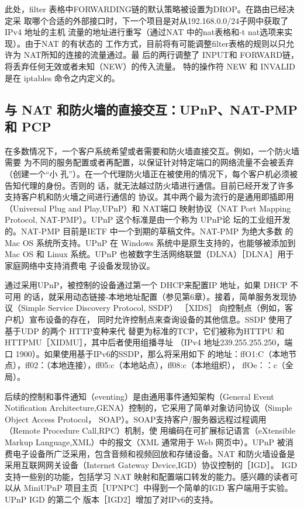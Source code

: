 此处，filter 表格中FORWARDING链的默认策略被设置为DROP。在路由已经决定采
取哪个合适的外部接口时，下一个项目是对从192.168.0.0/24子网中获取了IPv4 地址的主机
流量的地址进行重写（通过NAT 中的nat表格和-t nat选项来实现）。由于NAT 的有状态的
工作方式，目前将有可能调整filter表格的规则以只允许为 NAT所知的连接的流量通过。最
后的两行调整了 INPUT和 FORWARD链，将丢弃任何无效或者未知（NEW）的传入流量。
特的操作符 NEW 和 INVALID 是在 iptables 命令之内定义的。

\subsection{与 NAT 和防火墙的直接交互：UPnP、NAT-PMP 和 PCP}

在多数情况下，一个客户系统希望或者需要和防火墙直接交互。例如，一个防火墙需要
为不同的服务配置或者再配置，以保证针对特定端口的网络流量不会被丢弃（创建一个“小
孔”）。在一个代理防火墙正在被使用的情况下，每个客户机必须被告知代理的身份。否则的
话，就无法越过防火墙进行通信。目前已经开发了许多支持客户机和防火墻之间进行通信的
协议。其中两个最为流行的是通用即插即用（Universal Plug and Play,UPnP）和 NAT端口
映射协议（NAT Port Mapping Protocol, NAT-PMP）。UPnP 这个标准是由一个称为 UPnP论
坛的工业组开发的。NAT-PMP 目前是IETF 中一个到期的草稿文件。NAT-PMP 为绝大多数
的Mac OS 系统所支持。UPnP 在 Windows 系统中是原生支持的，也能够被添加到 Mac OS
和 Linux 系统。UPnP 也被数字生活网络联盟（DLNA）［DLNA］用于家庭网络中支持消费电
子设备发现协议。

通过采用UPnP，被控制的设备通过第一个 DHCP来配置IP 地址，如果 DHCP 不可用
的话，就采用动态链接-本地地址配置（参见第6章）。接着，简单服务发现协议（Simple
Service Discovery Protocol, SSDP） ［XIDS］ 向控制点（例如，客户机）宣布设备的存在，
同时允许控制点来查询设备的其他信息。SSDP 使用了基于UDP 的两个 HTTP变种来代
替更为标准的TCP，它们被称为HTTPU 和 HTTPMU［XIDMU］，其中后者使用组播寻址
（IPv4 地址239.255.255.250，端口 1900）。如果使用基于IPv6的SSDP，那么将采用如下
的地址：ffO1:C（本地节点），ff02：（本地连接），ff05:c（本地站点），ff08:c（本地组织），
ffOe：：c（全局）。

后续的控制和事件通知（eventing）是由通用事件通知架构（General Event Notification
Architecture,GENA）控制的，它采用了简单对象访问协议（Simple Object Access Protocol，
SOAP）。SOAP支持客户/服务器远程过程调用（Remote Procedure Call,RPC）机制，使
用编码在可扩展标记语言（eXtensible Markup Language,XML）中的报文（XML 通常用于
Web 网页中）。UPnP 被消费电子设备所广泛采用，包含音频和视频回放和存储设备。NAT
和防火墙设备是采用互联网网关设备（Internet Gateway Device,IGD）协议控制的［IGD］。
IGD 支持一些别的功能，包括学习 NAT 映射和配置端口转发的能力。感兴趣的读者可以从
MiniUPnP 项目主页［UPNPC］中得到一个简单的IGD 客户端用于实验。UPnP IGD 的第二个
版本［IGD2］增加了对IPv6的支持。

